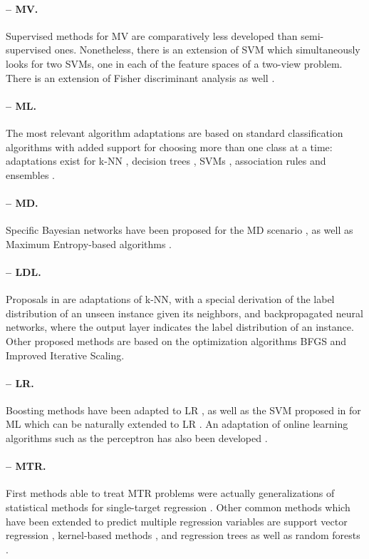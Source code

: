 \paragraph{-- MV.} Supervised methods for MV are comparatively less developed than semi-supervised ones. Nonetheless, there is an extension of SVM \cite{mv-svm} which simultaneously looks for two SVMs, one in each of the feature spaces of a two-view problem. There is an extension of Fisher discriminant analysis as well \cite{mv-fda}.

\paragraph{-- ML.} The most relevant algorithm adaptations \cite{mlmethods} are based on standard classification algorithms with added support for choosing more than one class at a time: adaptations exist for k-NN \cite{ml-knn}, decision trees \cite{ml-dt}, SVMs \cite{ml-svm}, association rules \cite{ml-rules} and ensembles \cite{mlensembles}.

\paragraph{-- MD.} Specific Bayesian networks have been proposed for the MD scenario \cite{md-bayes,md-bayes2}, as well as Maximum Entropy-based algorithms \cite{mdc,mdc-indep}.

\paragraph{-- LDL.} Proposals in \cite{ldl} are adaptations of k-NN, with a special derivation of the label distribution of an unseen instance given its neighbors, and backpropagated neural networks, where the output layer indicates the label distribution of an instance. Other proposed methods are based on the optimization algorithms BFGS and Improved Iterative Scaling. 

\paragraph{-- LR.} Boosting methods have been adapted to LR \cite{lr-boost}, as well as the SVM proposed in \cite{ml-svm} for ML which can be naturally extended to LR \cite{lranksurvey}. An adaptation of online learning algorithms such as the perceptron has also been developed \cite{lr-online}.

\paragraph{-- MTR.} First methods able to treat MTR problems were actually generalizations of statistical methods for single-target regression \cite{mtr-rank,mtr-canon}. Other common methods which have been extended to predict multiple regression variables are support vector regression \cite{mtr-svr1,mtr-svr2}, kernel-based methods \cite{mtr-kern1,mtr-kern2}, and regression trees \cite{mtr-trees} as well as random forests \cite{mtr-rf}.


